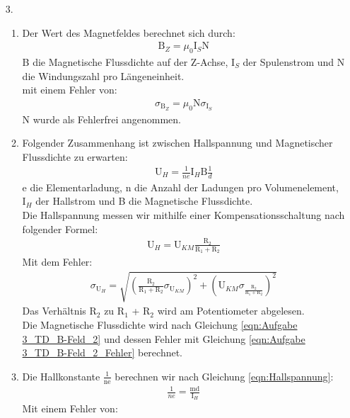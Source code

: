 \documentclass[12pt]{scrartcl}
\begin{document}
\begin{enumerate}
\item[3.]
\begin{enumerate}
\item
Der Wert des Magnetfeldes berechnet sich durch:
\begin{align}
 \text{B}_Z = \mu_0 \text{I}_S \text{N}
 \label{eqn:Aufgabe 3_TD_B-Feld_2}
\end{align}
B die Magnetische Flussdichte auf der Z-Achse, I$_S$ der Spulenstrom und N die Windungszahl pro Längeneinheit.\\
mit einem Fehler von:
\begin{align}
\sigma_{\text{B}_Z} = \mu_0 \text{N} \sigma_{\text{I}_S}
\label{eqn:Aufgabe 3_TD_B-Feld_2_Fehler}
\end{align}
N wurde als Fehlerfrei angenommen.\\
\item
Folgender Zusammenhang ist zwischen Hallspannung und Magnetischer Flussdichte zu erwarten:
\begin{align}
\text{U}_H = \frac{1}{ne} \text{I}_H \text{B} \frac{1}{d}
\label{eqn:Hallspannung}
\end{align}
e die Elementarladung, n die Anzahl der Ladungen pro Volumenelement, I$_H$ der Hallstrom und B die Magnetische Flussdichte.\\
Die Hallspannung messen wir mithilfe einer Kompensationsschaltung nach folgender Formel:
\begin{align}
\text{U}_H = \text{U}_{KM} \frac{\text{R}_2}{\text{R}_1+\text{R}_2}
\label{eqn:U_H}
\end{align}
Mit dem Fehler:
\begin{align}
\sigma_{\text{U}_H} = \sqrt{
\left(\frac{\text{R}_2}{\text{R}_1+\text{R}_2}\sigma_{\text{U}_{KM}}\right)^2+
\left(\text{U}_{KM}\sigma_{\frac{\text{R}_2}{\text{R}_1+\text{R}_2}}\right)^2}
\label{eqn:U_H_Fehler}
\end{align}
Das Verhältnis R$_2$ zu R$_1$ + R$_2$ wird am Potentiometer abgelesen.\\
Die Magnetische Flussdichte wird nach Gleichung \ref{eqn:Aufgabe 3_TD_B-Feld_2} und dessen Fehler mit Gleichung \ref{eqn:Aufgabe 3_TD_B-Feld_2_Fehler} berechnet.
\item
Die Hallkonstante $\frac{1}{\text{ne}}$ berechnen wir nach Gleichung \ref{eqn:Hallspannung}:
\begin{align*}
\frac{1}{ne} = \frac{\text{m} \text{d}}
{\text{I}_H}
\end{align*}
Mit einem Fehler von:
\begin{align}

\end{align}
\end{enumerate}
\end{enumerate}
\end{document}
